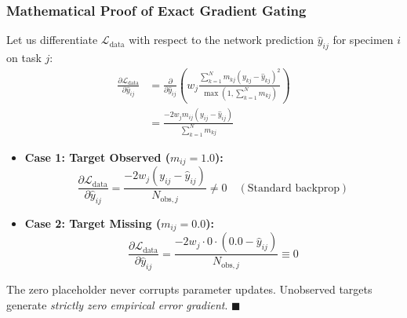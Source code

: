 \documentclass[conference]{IEEEtran}
\begin{document}
\subsubsection{Mathematical Proof of Exact Gradient Gating}
Let us differentiate $\mathcal{L}_{\text{data}}$ with respect to the network prediction $\hat{y}_{ij}$ for specimen $i$ on task $j$:
\begin{align}
    \frac{\partial \mathcal{L}_{\text{data}}}{\partial \hat{y}_{ij}} &= \frac{\partial}{\partial \hat{y}_{ij}} \left( w_j \frac{\sum_{k=1}^N m_{kj} (y_{kj} - \hat{y}_{kj})^2}{\max(1, \sum_{k=1}^N m_{kj})} \right) \\
    &= \frac{-2 w_j m_{ij} (y_{ij} - \hat{y}_{ij})}{\sum_{k=1}^N m_{kj}}
\end{align}
\begin{itemize}
    \item \textbf{Case 1: Target Observed ($m_{ij} = 1.0$):}
    \begin{equation}
        \frac{\partial \mathcal{L}_{\text{data}}}{\partial \hat{y}_{ij}} = \frac{-2 w_j (y_{ij} - \hat{y}_{ij})}{N_{\text{obs}, j}} \neq 0 \quad (\text{Standard backprop})
    \end{equation}
    \item \textbf{Case 2: Target Missing ($m_{ij} = 0.0$):}
    \begin{equation}
        \frac{\partial \mathcal{L}_{\text{data}}}{\partial \hat{y}_{ij}} = \frac{-2 w_j \cdot 0 \cdot (0.0 - \hat{y}_{ij})}{N_{\text{obs}, j}} \equiv 0
    \end{equation}
\end{itemize}
The zero placeholder never corrupts parameter updates. Unobserved targets generate \textit{strictly zero empirical error gradient}. \hfill $\blacksquare$
\end{document}
